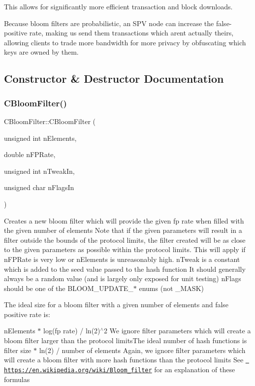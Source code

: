 This allows for significantly more efficient transaction and block downloads.

Because bloom filters are probabilistic, an S\+PV node can increase the false-\/ positive rate, making us send them transactions which aren\textquotesingle{}t actually theirs, allowing clients to trade more bandwidth for more privacy by obfuscating which keys are owned by them. 

\subsection{Constructor \& Destructor Documentation}
\mbox{\label{class_c_bloom_filter_a6395cfcb278ed9cf4ae873549c996f83}} 
\subsubsection{\texorpdfstring{CBloomFilter()}{CBloomFilter()}}
{\footnotesize\ttfamily C\+Bloom\+Filter\+::\+C\+Bloom\+Filter (\begin{DoxyParamCaption}\item[{unsigned int}]{n\+Elements,  }\item[{double}]{n\+F\+P\+Rate,  }\item[{unsigned int}]{n\+Tweak\+In,  }\item[{unsigned char}]{n\+Flags\+In }\end{DoxyParamCaption})}

Creates a new bloom filter which will provide the given fp rate when filled with the given number of elements Note that if the given parameters will result in a filter outside the bounds of the protocol limits, the filter created will be as close to the given parameters as possible within the protocol limits. This will apply if n\+F\+P\+Rate is very low or n\+Elements is unreasonably high. n\+Tweak is a constant which is added to the seed value passed to the hash function It should generally always be a random value (and is largely only exposed for unit testing) n\+Flags should be one of the B\+L\+O\+O\+M\+\_\+\+U\+P\+D\+A\+T\+E\+\_\+$\ast$ enums (not \+\_\+\+M\+A\+SK)

The ideal size for a bloom filter with a given number of elements and false positive rate is\+:
\begin{DoxyItemize}
\item n\+Elements $\ast$ log(fp rate) / ln(2)$^\wedge$2 We ignore filter parameters which will create a bloom filter larger than the protocol limits\+The ideal number of hash functions is filter size $\ast$ ln(2) / number of elements Again, we ignore filter parameters which will create a bloom filter with more hash functions than the protocol limits See \href{https://en.wikipedia.org/wiki/Bloom_filter}{\texttt{ https\+://en.\+wikipedia.\+org/wiki/\+Bloom\+\_\+filter}} for an explanation of these formulas 
\end{DoxyItemize}

